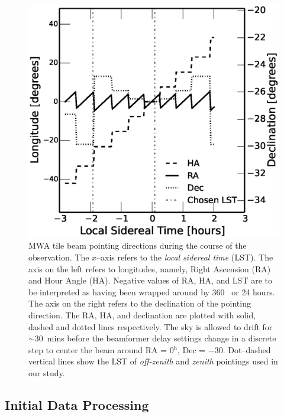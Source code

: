 \documentclass[preprint2,iop,numberedappendix]{emulateapj}
\begin{document}
\begin{figure}[htb]
\centering
\includegraphics[width=\linewidth]{f2.eps}
\caption{MWA tile beam pointing directions during the course of the observation. The $x$--axis refers to the {\it local sidereal time} (LST). The axis on the left refers to longitudes, namely, Right Ascension (RA) and Hour Angle (HA). Negative values of RA, HA, and LST are to be interpreted as having been wrapped around by 360\arcdeg~ or 24 hours. The axis on the right refers to the declination of the pointing direction. The RA, HA, and declination are plotted with solid, dashed and dotted lines respectively. The sky is allowed to drift for $\sim 30$~mins before the beamformer delay settings change in a discrete step to center the beam around RA = 0$^\textrm{h}$, Dec = $-30$\arcdeg. Dot--dashed vertical lines show the LST of {\it off-zenith} and {\it zenith} pointings used in our study. \label{fig:pointings}}
\end{figure}

\subsection{Initial Data Processing}\label{sec:data-analysis}
\end{document}
